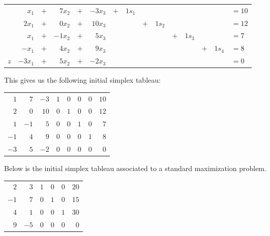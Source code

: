 \documentclass[12pt,letterpaper]{exam}
\begin{document}
\begin{questions}
{\begin{table}[!ht]
\centering
\begin{tabular}{rrrrrrrrrrrrrrl}
	& $x_1$    & $+$ & $7x_2$  & $+$ & $-3x_3$  & $+$ & $1s_1$ &        &              &        &              &        &              & $= 10$ \\
	& $2x_1$  & $+$ & $0x_2$  & $+$ & $10x_3$ &        &              & $+$ & $1s_2$ &        &              &        &              & $= 12$ \\
	& $x_1$    & $+$ & $-1x_2$ & $+$ & $5x_3$   &        &              &        &              & $+$ & $1s_3$ &        &              & $= 7$ \\
	& $-x_1$    & $+$ & $4x_2$ & $+$ & $9x_3$  &        &              &        &              &        &              & $+$ & $1s_4$ & $= 8$ \\
$z$ 	& $-3x_1$ & $+$ & $5x_2$  & $+$ & $-2x_3$  &        &              &        &              &        &              &        &              & $= 0$ 
\end{tabular}
\end{table} \pspace

This gives us the following initial simplex tableau: \pspace
	\begin{table}[!ht]
	\centering
	\begin{tabular}{rrrrrrr|r}
	$1$ & $7$ & $-3$ & $1$ & $0$ & $0$ & $0$ & $10$ \\
	$2$ & $0$ & $10$ & $0$ & $1$ & $0$ & $0$ & $12$ \\
	$1$ & $-1$ & $5$ & $0$ & $0$ & $1$ & $0$ & $7$ \\
	$-1$ & $4$ & $9$ & $0$ & $0$ & $0$ & $1$ & $8$ \\ \hline
	$-3$ & $5$ & $-2$ & $0$ & $0$ & $0$ & $0$ & $0$ 
	\end{tabular}
	\end{table}
}



\newpage
\question Below is the initial simplex tableau associated to a standard maximization problem. 
	\begin{table}[!ht]
	\centering
	\begin{tabular}{rrrrr|r}
	$2$ & $3$ & $1$ & $0$ & $0$ & $20$ \\
	$-1$ & {\large \textcircled{\small$7$}} & $0$ & $1$ & $0$ & $15$ \\
	$4$ & $1$ & $0$ & $0$ & $1$ & $30$ \\ \hline
	$9$ & $-5$ & $0$ & $0$ & $0$ & $0$ 
	\end{tabular}
	\end{table}


\end{questions}
\end{document}
